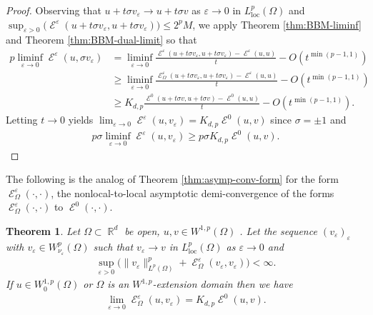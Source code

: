 \documentclass[12pt, reqno]{amsart}%
\theoremstyle{plain}  %
\newtheorem{theorem}{Theorem}[section]
\theoremstyle{definition}  %
\numberwithin{equation}{section}
\DeclareMathOperator{\loc}{loc}
\DeclareMathOperator{\cE}{\mathcal{E}}
\DeclareMathOperator{\R}{\mathbb{R}}
\newcommand{\eps}{\varepsilon}
\begin{document}
\begin{proof}
Observing that $u+t\sigma v_\eps\to u+t\sigma v$ as $\eps\to0$ in $L^p_{\loc}(\Omega)$ and  $\sup_{\eps>0} \big(\cE^\eps(u+ t\sigma v_\eps,u+ t\sigma v_\eps)\big)\leq 2^pM$,  we apply
Theorem \ref{thm:BBM-liminf} and Theorem \ref{thm:BBM-dual-limit} so  that
\begin{align*}
p \liminf_{\eps\to0}\cE^\eps(u, \sigma v_\eps)
&= \liminf_{\eps\to0}	\frac{\cE^\eps(u+t\sigma v_\eps, u+t\sigma v_\eps)-\cE^\eps(u, u)}{t}- O( t^{\min (p-1,1)}) \\
&\geq \liminf_{\eps\to0}	\frac{\cE^\eps_\Omega(u+t\sigma v_\eps, u+t\sigma v_\eps)-\cE^\eps(u, u)}{t}- O( t^{\min (p-1,1)}) \\
& \geq K_{d,p}	\frac{\cE^0(u+t\sigma v, u+t\sigma v)-\cE^0(u, u)}{t} - O( t^{\min (p-1,1)}).
\end{align*}
Letting $t\to 0$ yields $ \lim_{\eps\to0}\cE^\eps(u,v_\eps)=  K_{d,p}	\cE^0(u, v)$ since $ \sigma =\pm1$  and
\begin{align*}
p  \sigma \liminf_{\eps\to0}\cE^\eps(u,v_\eps) \geq p \sigma  K_{d,p}	\cE^0(u, v).
\end{align*}
\end{proof}

\noindent The following  is the  analog of Theorem \ref{thm:asymp-conv-form} for the form $\cE^\eps_\Omega(\cdot,\cdot)$, the nonlocal-to-local asymptotic demi-convergence of the forms $\cE^\eps_\Omega (\cdot,\cdot)$ to $\cE^0(\cdot,\cdot)$.
\begin{theorem}\label{thm:asymp-conv-reg-form}
Let $\Omega\subset \R^d$ be open,  $u,v\in W^{1,p}(\Omega)$ . Let the sequence $ (v_\eps)_\eps$ with  $v_\eps \in W_{\nu_\eps}^p(\Omega)$ such that  $v_\eps \to v$ in $L^p_{\loc}(\Omega)$ as $\eps\to0$ and
\begin{align*}
\sup_{\eps>0} \big(\|v_\eps\|^p_{L^p(\Omega)}+ \cE^\eps_\Omega(v_\eps,v_\eps)\big)<\infty.
\end{align*}
If $u\in W^{1,p}_0(\Omega)$ or $\Omega$ is an $W^{1,p}$-extension domain then we have
\begin{align*}
\lim_{\eps\to0}\cE^\eps_\Omega(u,  v_\eps)
= K_{d,p}\cE^0(u, v).
\end{align*}
\end{theorem}
\end{document}
